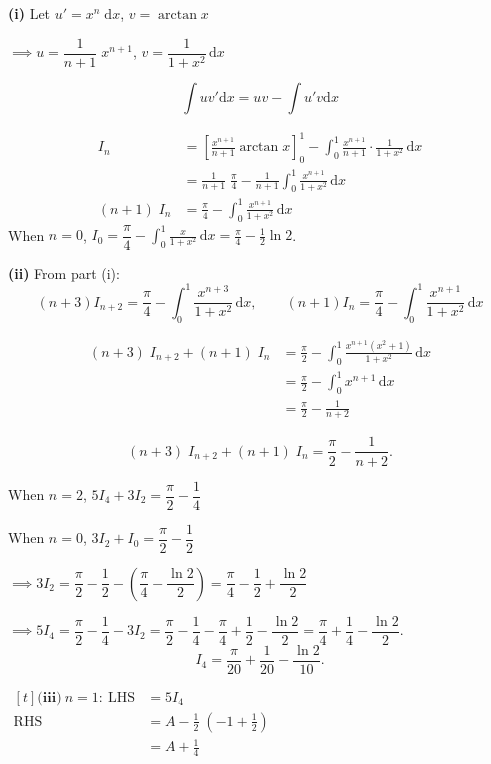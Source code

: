\documentclass[12pt]{article}
\begin{document}
\textbf{(i)} Let $u' = x^n \;\mathrm{d}x$, $v = \arctan x$

$\implies u=\dfrac{1}{n+1}\;x^{n+1}$, $v = \dfrac{1}{1+x^2}\,\mathrm{d}x$

$$\displaystyle\int uv'\mathrm{d}x=uv-\displaystyle\int u'v\mathrm{d}x$$

\begin{align*}
I_n &= \left[\frac{x^{n+1}}{n+1}\arctan x\right]_0^1 - \int_0^1 \frac{x^{n+1}}{n+1}\cdot\frac{1}{1+x^2}\,\mathrm{d}x\\
&= \frac{1}{n+1}\;\frac{\pi}{4} - \frac{1}{n+1}\int_0^1 \frac{x^{n+1}}{1+x^2}\,\mathrm{d}x\\
(n+1)\;I_n &= \frac{\pi}{4} - \int_0^1 \frac{x^{n+1}}{1+x^2}\,\mathrm{d}x
\end{align*}
When $n=0$, \qquad $I_0 = \dfrac{\pi}{4} - \displaystyle\int_0^1 \frac{x}{1+x^2}\,\mathrm{d}x = \frac{\pi}{4} - \frac{1}{2}\ln 2$.



\bigskip
\textbf{(ii)} From part (i):
$$(n+3)I_{n+2} = \frac{\pi}{4} - \int_0^1 \frac{x^{n+3}}{1+x^2}\,\mathrm{d}x, \qquad (n+1)I_n = \frac{\pi}{4} - \int_0^1 \frac{x^{n+1}}{1+x^2}\,\mathrm{d}x$$

\begin{align*}
(n+3)\;I_{n+2} + (n+1)\;I_n &= \frac{\pi}{2} - \int_0^1 \frac{x^{n+1}(x^2+1)}{1+x^2}\,\mathrm{d}x\\
&= \frac{\pi}{2} - \int_0^1 x^{n+1}\,\mathrm{d}x\\
&= \frac{\pi}{2} - \frac{1}{n+2}
\end{align*}

$$\boxed{(n+3)\;I_{n+2} + (n+1)\;I_n = \frac{\pi}{2} - \frac{1}{n+2}.}$$

When $n=2$, \qquad $5I_4 + 3I_2 = \dfrac{\pi}{2} - \dfrac{1}{4}$

When $n=0$, \qquad $3I_2 + I_0 = \dfrac{\pi}{2} - \dfrac{1}{2}$

$\implies 3I_2 = \dfrac{\pi}{2} - \dfrac{1}{2} - \left(\dfrac{\pi}{4} - \dfrac{\ln 2}{2}\right) = \dfrac{\pi}{4} - \dfrac{1}{2} + \dfrac{\ln 2}{2}$

$\implies 5I_4 = \dfrac{\pi}{2} - \dfrac{1}{4} - 3I_2 = \dfrac{\pi}{2} - \dfrac{1}{4} - \dfrac{\pi}{4} + \dfrac{1}{2} - \dfrac{\ln 2}{2} = \dfrac{\pi}{4} + \dfrac{1}{4} - \dfrac{\ln 2}{2}$.
$$\boxed{I_4 = \frac{\pi}{20} + \frac{1}{20} - \frac{\ln 2}{10}.}$$




\bigskip

\noindent
\(
\begin{aligned}[t]
\textbf{(iii)}\ n=1:\ \text{LHS} &= 5I_4\\
\text{RHS} &= A - \frac{1}{2}\;\left( -1 + \frac{1}{2}\right)\\
&= A + \frac{1}{4}
\end{aligned}
\)
\end{document}
